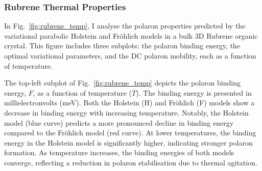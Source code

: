 
\subsubsection{Rubrene Thermal Properties}

In Fig.~\ref{fig:rubrene_temp}, I analyse the polaron properties predicted by the variational parabolic Holstein and Fröhlich models in a bulk 3D Rubrene organic crystal. This figure includes three subplots: the polaron binding energy, the optimal variational parameters, and the DC polaron mobility, each as a function of temperature.

The top-left subplot of Fig.~\ref{fig:rubrene_temp} depicts the polaron binding energy, $F$, as a function of temperature ($T$). The binding energy is presented in millielectronvolts (meV). Both the Holstein (H) and Fr\"ohlich (F) models show a decrease in binding energy with increasing temperature. Notably, the Holstein model (blue curve) predicts a more pronounced decline in binding energy compared to the Fr\"ohlich model (red curve). At lower temperatures, the binding energy in the Holstein model is significantly higher, indicating stronger polaron formation. As temperature increases, the binding energies of both models converge, reflecting a reduction in polaron stabilisation due to thermal agitation.

